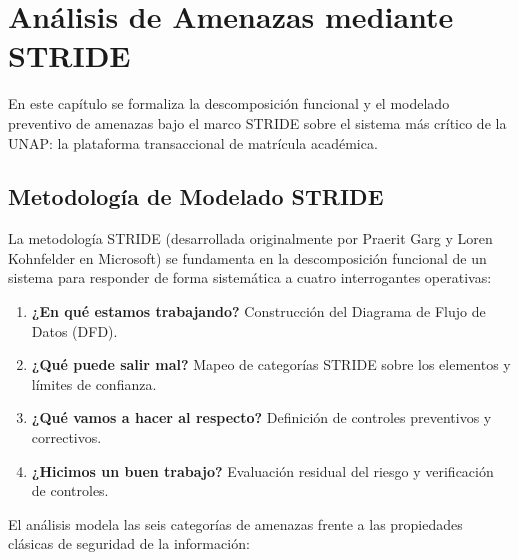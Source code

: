 \chapter{Análisis de Amenazas mediante STRIDE}
\label{ch:analisis_stride}

En este capítulo se formaliza la descomposición funcional y el modelado preventivo de amenazas bajo el marco STRIDE sobre el sistema más crítico de la UNAP: la plataforma transaccional de matrícula académica.

\section{Metodología de Modelado STRIDE}

La metodología STRIDE (desarrollada originalmente por Praerit Garg y Loren Kohnfelder en Microsoft) se fundamenta en la descomposición funcional de un sistema para responder de forma sistemática a cuatro interrogantes operativas:
\begin{enumerate}[itemsep=2pt,topsep=1.5pt,parsep=0pt]
    \item \textbf{¿En qué estamos trabajando?} Construcción del Diagrama de Flujo de Datos (DFD).
    \item \textbf{¿Qué puede salir mal?} Mapeo de categorías STRIDE sobre los elementos y límites de confianza.
    \item \textbf{¿Qué vamos a hacer al respecto?} Definición de controles preventivos y correctivos.
    \item \textbf{¿Hicimos un buen trabajo?} Evaluación residual del riesgo y verificación de controles.
\end{enumerate}

El análisis modela las seis categorías de amenazas frente a las propiedades clásicas de seguridad de la información:


